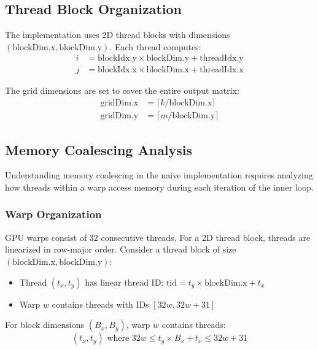 \documentclass{amsbook}
\theoremstyle{definition}
\begin{document}
\subsection{Thread Block Organization}

The implementation uses 2D thread blocks with dimensions $(\text{blockDim.x}, \text{blockDim.y})$. Each thread computes:
\begin{align}
i &= \text{blockIdx.y} \times \text{blockDim.y} + \text{threadIdx.y} \\
j &= \text{blockIdx.x} \times \text{blockDim.x} + \text{threadIdx.x}
\end{align}

The grid dimensions are set to cover the entire output matrix:
\begin{align}
\text{gridDim.x} &= \lceil k/\text{blockDim.x} \rceil \\
\text{gridDim.y} &= \lceil m/\text{blockDim.y} \rceil
\end{align}

\subsection{Memory Coalescing Analysis}

Understanding memory coalescing in the naive implementation requires analyzing how threads within a warp access memory during each iteration of the inner loop.

\subsubsection{Warp Organization}

GPU warps consist of 32 consecutive threads. For a 2D thread block, threads are linearized in row-major order. Consider a thread block of size $(\text{blockDim.x}, \text{blockDim.y})$:

\begin{itemize}
\item Thread $(t_x, t_y)$ has linear thread ID: $\text{tid} = t_y \times \text{blockDim.x} + t_x$
\item Warp $w$ contains threads with IDs $[32w, 32w+31]$
\end{itemize}

For block dimensions $(B_x, B_y)$, warp $w$ contains threads:
\begin{equation}
(t_x, t_y) \text{ where } 32w \leq t_y \times B_x + t_x \leq 32w + 31
\end{equation}
\end{document}
